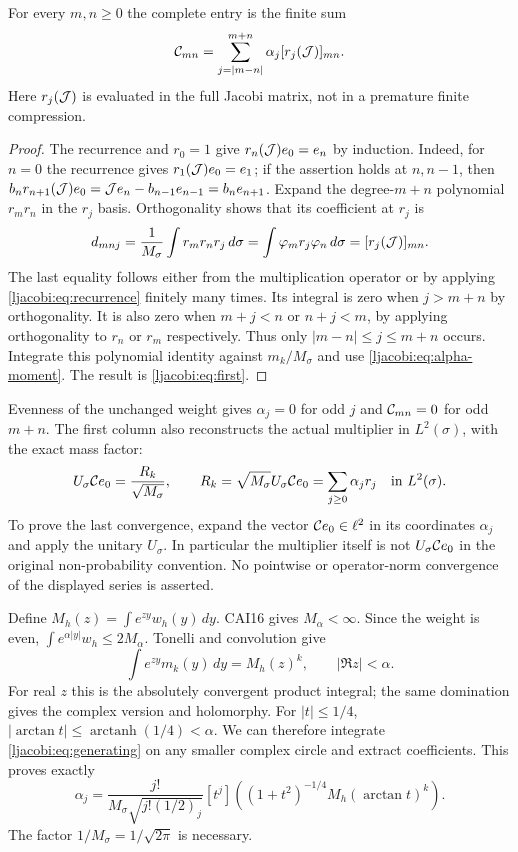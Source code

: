 \documentclass[11pt]{article}
\begin{document}
\begin{ljacobitheorem}\label{ljacobi:thm:first}
For every $m,n\geq0$ the complete entry is the finite sum
\begin{equation}\label{ljacobi:eq:first}
 \mathcal C_{mn}=\sum_{j=|m-n|}^{m+n}\alpha_j[r_j(\mathcal J)]_{mn}.
\end{equation}
Here $r_j(\mathcal J)$ is evaluated in the full Jacobi matrix, not in a
premature finite compression.
\end{ljacobitheorem}
\begin{proof}
The recurrence and $r_0=1$ give $r_n(\mathcal J)e_0=e_n$ by induction.
Indeed, for $n=0$ the recurrence gives $r_1(\mathcal J)e_0=e_1$; if the
assertion holds at $n,n-1$, then
$b_n r_{n+1}(\mathcal J)e_0=\mathcal J e_n-b_{n-1}e_{n-1}=b_ne_{n+1}$.
Expand the degree-$m+n$ polynomial $r_mr_n$ in the $r_j$ basis.
Orthogonality shows that its coefficient at $r_j$ is
\[
 d_{mnj}=\frac1{M_\sigma}\int r_mr_nr_j\,d\sigma
       =\int\varphi_m r_j\varphi_n\,d\sigma
       =[r_j(\mathcal J)]_{mn}.
\]
The last equality follows either from the multiplication operator
or by applying \eqref{ljacobi:eq:recurrence} finitely many times. Its
integral is zero when $j>m+n$ by orthogonality. It is also zero
when $m+j<n$ or $n+j<m$, by applying orthogonality to $r_n$ or
$r_m$ respectively. Thus only $|m-n|\leq j\leq m+n$ occurs.
Integrate this polynomial identity against $m_k/M_\sigma$ and
use \eqref{ljacobi:eq:alpha-moment}. The result is \eqref{ljacobi:eq:first}.
\end{proof}

Evenness of the unchanged weight gives $\alpha_j=0$ for odd $j$ and
$\mathcal C_{mn}=0$ for odd $m+n$. The first column also reconstructs the
actual multiplier in $L^2(\sigma)$, with the exact mass factor:
\begin{equation}\label{ljacobi:eq:mass-caveat}
 U_\sigma\mathcal C e_0=\frac{R_k}{\sqrt{M_\sigma}},\qquad
 R_k=\sqrt{M_\sigma}U_\sigma\mathcal C e_0
       =\sum_{j\geq0}\alpha_jr_j\quad\text{in }L^2(\sigma).
\end{equation}
To prove the last convergence, expand the vector $\mathcal C e_0\in\ell^2$
in its coordinates $\alpha_j$ and apply the unitary $U_\sigma$.
In particular the multiplier itself is not $U_\sigma\mathcal C e_0$ in
the original non-probability convention. No pointwise or
operator-norm convergence of the displayed series is asserted.

Define $M_h(z)=\int e^{zy}w_h(y)\,dy$. CAI16 gives
$M_\alpha<\infty$. Since the weight is even,
$\int e^{\alpha|y|}w_h\leq2M_\alpha$. Tonelli and convolution give
\[
 \int e^{zy}m_k(y)\,dy=M_h(z)^k,
 \qquad |\Re z|<\alpha.
\]
For real $z$ this is the absolutely convergent product integral;
the same domination gives the complex version and holomorphy.
For $|t|\leq1/4$,
$|\arctan t|\leq\operatorname{arctanh}(1/4)<\alpha$.
We can therefore integrate \eqref{ljacobi:eq:generating} on any smaller
complex circle and extract coefficients. This proves exactly
\begin{equation}\label{ljacobi:eq:alpha-generating}
 \boxed{\alpha_j=
 \frac{j!}{M_\sigma\sqrt{j!(1/2)_j}}
 [t^j]\left((1+t^2)^{-1/4}M_h(\arctan t)^k\right).}
\end{equation}
The factor $1/M_\sigma=1/\sqrt{2\pi}$ is necessary.
\end{document}
